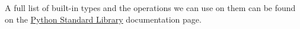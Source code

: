 \documentclass{tufte-book}
\begin{document}

 A full list of built-in types and the operations we can use on them can be found on the \href{https://docs.python.org/3/library/stdtypes.html}{Python Standard Library} documentation page.
\end{document}
